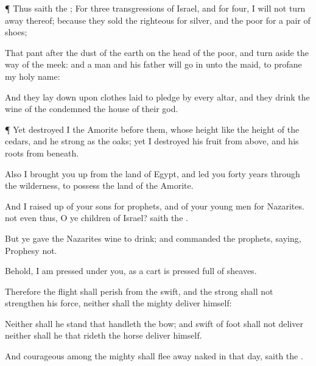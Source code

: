 {\par }{\PP {}¶ Thus
saith the
{}; For
three
transgressions of
Israel, and for
four, I will not turn
away
{} thereof; because they
sold the
righteous for
silver, and the
poor for a pair of
shoes;

That
pant after the
dust of the
earth on the
head of the
poor, and turn
aside the
way of the
meek: and a
man and his
father will
go in unto the
{}
maid, to
profane my
holy
name:

And they lay
{}
down upon
clothes laid to
pledge
by every
altar, and they
drink the
wine of the
condemned
{} the
house of their
god.


\par }{\PP {}¶ Yet
destroyed I the
Amorite
before them, whose
height
{} like the
height of the
cedars, and he
{}
strong as the
oaks; yet I
destroyed his
fruit from
above, and his
roots from beneath.

Also I brought you
up from the
land of
Egypt, and
led you
forty
years through the
wilderness, to
possess the
land of the
Amorite.

And I raised
up of your
sons for
prophets, and of your young
men for
Nazarites.
{} not even thus, O ye
children of
Israel?
saith the
{}.

But ye gave the
Nazarites
wine to
drink; and
commanded the
prophets,
saying,
Prophesy not.

Behold, I am
pressed under you, as a
cart is
pressed
{}
full of
sheaves.

Therefore the
flight shall
perish from the
swift, and the
strong shall not
strengthen his
force, neither shall the
mighty
deliver
himself:

Neither shall he
stand that
handleth the
bow; and
{}
swift of
foot shall not
deliver
{} neither shall he that
rideth the
horse
deliver
himself.

And
{}
courageous among the
mighty shall flee
away
naked in that
day,
saith the
{}.




}
